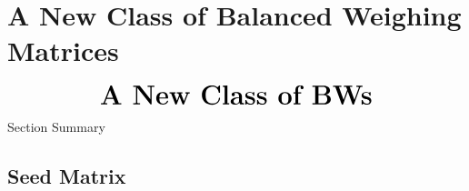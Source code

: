 \documentclass{beamer}
\begin{document}

\section{A New Class of Balanced Weighing Matrices}

\begin{frame}
  \[
    \text{\huge\bf A New Class of BWs}
  \]
\end{frame}

\begin{frame}{Section Summary}
  \tableofcontents[sections={4}]
\end{frame}


\subsection{Seed Matrix}
\end{document}
